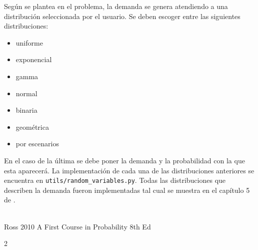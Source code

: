 \documentclass[twoside]{article}
\begin{document}
\begin{multicols}{2}
Seg\'un se plantea en el problema, la demanda se genera atendiendo a una distribuci\'on seleccionada por el usuario. Se deben escoger entre las siguientes distribuciones:

\begin{itemize}
\item uniforme
\item exponencial
\item gamma
\item normal
\item binaria
\item geom\'etrica
\item por escenarios
\end{itemize}

En el caso de la \'ultima se debe poner la demanda y la probabilidad con la que esta aparecer\'a. La implementaci\'on de cada una de las distribuciones anteriores se encuentra en \texttt{utils/random\_variables.py}. Todas las distribuciones que describen la demanda fueron implementadas tal cual se muestra en el cap\'itulo 5 de \cite{ross}.\\\\


\begin{thebibliography}{99}
	 Ross 2010 A First Course in Probability 8th Ed
\end{thebibliography}






\end{multicols}{2}
\end{document}

